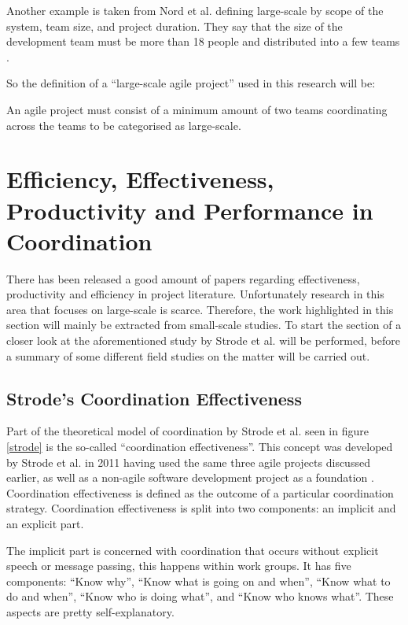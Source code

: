 Another example is taken from Nord et al. defining large-scale by scope of the system, team size, and project duration. They say that the size of the development team must be more than 18 people and distributed into a few teams \cite{Robert2014}.

So the definition of a ``large-scale agile project'' used in this research will be:

\begin{fancyquotes}
An agile project must consist of a minimum amount of two teams coordinating across the teams to be categorised as large-scale.
\end{fancyquotes}

\textbf{ }

\section{Efficiency, Effectiveness, Productivity and Performance in Coordination}
\label{efficiency}

There has been released a good amount of papers regarding effectiveness, productivity and efficiency in project literature. Unfortunately research in this area that focuses on large-scale is scarce. Therefore, the work highlighted in this section will mainly be extracted from small-scale studies. To start the section of a closer look at the aforementioned study by Strode et al. will be performed, before a summary of some different field studies on the matter will be carried out.

\subsection{Strode's Coordination Effectiveness}
\label{cordinationeffectiveness}

Part of the theoretical model of coordination by Strode et al. seen in figure \ref{strode} is the so-called ``coordination effectiveness''. This concept was developed by Strode et al. in 2011 having used the same three agile projects discussed earlier, as well as a non-agile software development project as a foundation \cite{Strode2011}. Coordination effectiveness is defined as the outcome of a particular coordination strategy. Coordination effectiveness is split into two components: an implicit and an explicit part.

The implicit part is concerned with coordination that occurs without explicit speech or message passing, this happens within work groups. It has five components: ``Know why'', ``Know what is going on and when'', ``Know what to do and when'', ``Know who is doing what'', and ``Know who knows what''. These aspects are pretty self-explanatory.

